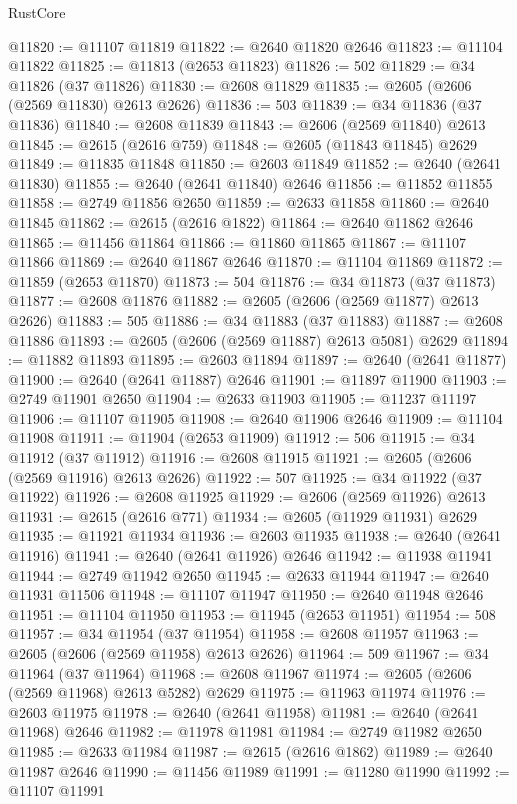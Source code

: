 \begin{lexlean}{RustCore}
\begin{coremodule}
@11820 := @11107 @11819
@11822 := @2640 @11820 @2646
@11823 := @11104 @11822
@11825 := @11813 (@2653 @11823)
@11826 := 502
@11829 := @34 @11826 (@37 @11826)
@11830 := @2608 @11829
@11835 := @2605 (@2606 (@2569 @11830) @2613 @2626)
@11836 := 503
@11839 := @34 @11836 (@37 @11836)
@11840 := @2608 @11839
@11843 := @2606 (@2569 @11840) @2613
@11845 := @2615 (@2616 @759)
@11848 := @2605 (@11843 @11845) @2629
@11849 := @11835 @11848
@11850 := @2603 @11849
@11852 := @2640 (@2641 @11830)
@11855 := @2640 (@2641 @11840) @2646
@11856 := @11852 @11855
@11858 := @2749 @11856 @2650
@11859 := @2633 @11858
@11860 := @2640 @11845
@11862 := @2615 (@2616 @1822)
@11864 := @2640 @11862 @2646
@11865 := @11456 @11864
@11866 := @11860 @11865
@11867 := @11107 @11866
@11869 := @2640 @11867 @2646
@11870 := @11104 @11869
@11872 := @11859 (@2653 @11870)
@11873 := 504
@11876 := @34 @11873 (@37 @11873)
@11877 := @2608 @11876
@11882 := @2605 (@2606 (@2569 @11877) @2613 @2626)
@11883 := 505
@11886 := @34 @11883 (@37 @11883)
@11887 := @2608 @11886
@11893 := @2605 (@2606 (@2569 @11887) @2613 @5081) @2629
@11894 := @11882 @11893
@11895 := @2603 @11894
@11897 := @2640 (@2641 @11877)
@11900 := @2640 (@2641 @11887) @2646
@11901 := @11897 @11900
@11903 := @2749 @11901 @2650
@11904 := @2633 @11903
@11905 := @11237 @11197
@11906 := @11107 @11905
@11908 := @2640 @11906 @2646
@11909 := @11104 @11908
@11911 := @11904 (@2653 @11909)
@11912 := 506
@11915 := @34 @11912 (@37 @11912)
@11916 := @2608 @11915
@11921 := @2605 (@2606 (@2569 @11916) @2613 @2626)
@11922 := 507
@11925 := @34 @11922 (@37 @11922)
@11926 := @2608 @11925
@11929 := @2606 (@2569 @11926) @2613
@11931 := @2615 (@2616 @771)
@11934 := @2605 (@11929 @11931) @2629
@11935 := @11921 @11934
@11936 := @2603 @11935
@11938 := @2640 (@2641 @11916)
@11941 := @2640 (@2641 @11926) @2646
@11942 := @11938 @11941
@11944 := @2749 @11942 @2650
@11945 := @2633 @11944
@11947 := @2640 @11931 @11506
@11948 := @11107 @11947
@11950 := @2640 @11948 @2646
@11951 := @11104 @11950
@11953 := @11945 (@2653 @11951)
@11954 := 508
@11957 := @34 @11954 (@37 @11954)
@11958 := @2608 @11957
@11963 := @2605 (@2606 (@2569 @11958) @2613 @2626)
@11964 := 509
@11967 := @34 @11964 (@37 @11964)
@11968 := @2608 @11967
@11974 := @2605 (@2606 (@2569 @11968) @2613 @5282) @2629
@11975 := @11963 @11974
@11976 := @2603 @11975
@11978 := @2640 (@2641 @11958)
@11981 := @2640 (@2641 @11968) @2646
@11982 := @11978 @11981
@11984 := @2749 @11982 @2650
@11985 := @2633 @11984
@11987 := @2615 (@2616 @1862)
@11989 := @2640 @11987 @2646
@11990 := @11456 @11989
@11991 := @11280 @11990
@11992 := @11107 @11991

\end{coremodule}
\end{lexlean}
